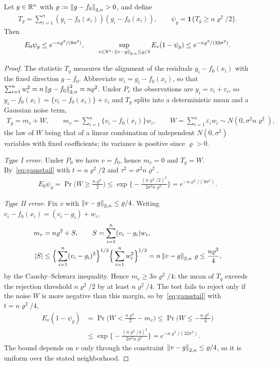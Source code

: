 \begin{auxlemma}\label{lem:test}
Let $g\in\mathbb{R}^n$ with $\varrho:=\left\lVert g-f_0 \right\rVert_{2,n}>0$, and define
\begin{align*}
T_g=\sum_{i=1}^n(y_i-f_0(x_i))(g_i-f_0(x_i)),
\qquad
\psi_g=\mathbf1\{T_g\geq n\varrho^2/2\}.
\end{align*}
Then
\begin{align*}
E_0\psi_g\leq e^{-n\varrho^2/(8\sigma^2)},
\qquad
\sup_{v\in\mathbb{R}^n:\,\left\lVert v-g \right\rVert_{2,n}\leq \varrho/4}E_v(1-\psi_g)\leq e^{-n\varrho^2/(32\sigma^2)} .
\end{align*}
\end{auxlemma}

\begin{proof}
The statistic $T_g$ measures the alignment of the residuals $y_i-f_0(x_i)$ with the fixed direction $g-f_0$. Abbreviate $w_i=g_i-f_0(x_i)$, so that $\sum_{i=1}^nw_i^2=n\left\lVert g-f_0 \right\rVert_{2,n}^2=n\varrho^2$. Under $P_v$ the observations are $y_i=v_i+\varepsilon_i$, so $y_i-f_0(x_i)=\{v_i-f_0(x_i)\}+\varepsilon_i$ and $T_g$ splits into a deterministic mean and a Gaussian noise term,
\begin{align*}
T_g=m_v+W,
\qquad
m_v=\sum_{i=1}^n\{v_i-f_0(x_i)\}w_i,
\qquad
W=\sum_{i=1}^n\varepsilon_iw_i\sim N(0,\sigma^2n\varrho^2),
\end{align*}
the law of $W$ being that of a linear combination of independent $N(0,\sigma^2)$ variables with fixed coefficients; its variance is positive since $\varrho>0$.

\emph{Type I error.} Under $P_0$ we have $v=f_0$, hence $m_v=0$ and $T_g=W$. By~\eqref{eq:gausstail} with $t=n\varrho^2/2$ and $\tau^2=\sigma^2n\varrho^2$,
\begin{align*}
E_0\psi_g
=\Pr\Big(W\geq\frac{n\varrho^2}{2}\Big)
\leq\exp\Big\{-\frac{(n\varrho^2/2)^2}{2\sigma^2n\varrho^2}\Big\}
=e^{-n\varrho^2/(8\sigma^2)}.
\end{align*}

\emph{Type II error.} Fix $v$ with $\left\lVert v-g \right\rVert_{2,n}\leq \varrho/4$. Writing $v_i-f_0(x_i)=(v_i-g_i)+w_i$,
\begin{align*}
m_v&=n\varrho^2+S,
\qquad
S=\sum_{i=1}^n(v_i-g_i)w_i,
\\
|S|&\leq\Big\{\sum_{i=1}^n(v_i-g_i)^2\Big\}^{1/2}\Big\{\sum_{i=1}^nw_i^2\Big\}^{1/2}
=n\left\lVert v-g \right\rVert_{2,n}\,\varrho\leq\frac{n\varrho^2}{4},
\end{align*}
by the Cauchy--Schwarz inequality. Hence $m_v\geq3n\varrho^2/4$: the mean of $T_g$ exceeds the rejection threshold $n\varrho^2/2$ by at least $n\varrho^2/4$. The test fails to reject only if the noise $W$ is more negative than this margin, so by~\eqref{eq:gausstail} with $t=n\varrho^2/4$,
\begin{align*}
E_v(1-\psi_g)
&=\Pr\Big(W<\frac{n\varrho^2}{2}-m_v\Big)
\leq\Pr\Big(W\leq-\frac{n\varrho^2}{4}\Big)\\
&\leq\exp\Big\{-\frac{(n\varrho^2/4)^2}{2\sigma^2n\varrho^2}\Big\}
=e^{-n\varrho^2/(32\sigma^2)}.
\end{align*}
The bound depends on $v$ only through the constraint $\left\lVert v-g \right\rVert_{2,n}\leq \varrho/4$, so it is uniform over the stated neighborhood.
\end{proof}

